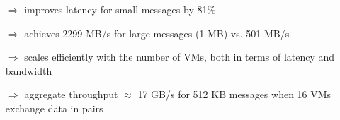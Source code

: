 \documentclass[a0paper,portrait,final]{baposter}
\newcommand{\compresslist}{%
\setlength{\itemsep}{0.2em}%
\setlength{\parskip}{0.2pt}%
\setlength{\parsep}{0.2pt}%
}
\begin{document}
\begin{poster}
{\begin{multicols}{2}
\end{multicols}
\begin{center}
\end{center}


\renewcommand{\thefootnote}{\roman{footnote}}

\begin{itemize}
\compresslist
\item[$\Rightarrow$] improves latency for small messages by 81\% 
\item[$\Rightarrow$] achieves 2299 MB/s for large messages (1 MB) vs. 501 MB/s
\item[$\Rightarrow$] scales efficiently with the number of VMs, both in terms of latency and bandwidth
\item[$\Rightarrow$] aggregate throughput $\approx$ 17 GB/s for 512 KB messages when 16 VMs exchange data in pairs
\end{itemize}



}

\end{poster}
\end{document}
